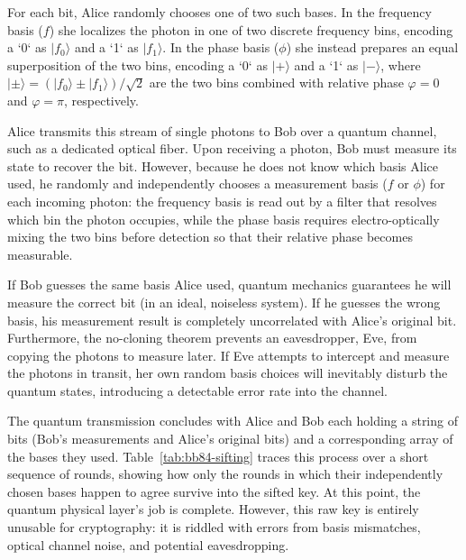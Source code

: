 For each bit, Alice randomly chooses one of two such bases. In the frequency basis ($f$) she localizes the photon in one of two discrete frequency bins, encoding a `0` as $|f_0\rangle$ and a `1` as $|f_1\rangle$. In the phase basis ($\phi$) she instead prepares an equal superposition of the two bins, encoding a `0` as $|{+}\rangle$ and a `1` as $|{-}\rangle$, where $|{\pm}\rangle = (|f_0\rangle \pm |f_1\rangle)/\sqrt{2}$ are the two bins combined with relative phase $\varphi=0$ and $\varphi=\pi$, respectively.

Alice transmits this stream of single photons to Bob over a quantum channel, such as a dedicated optical fiber. Upon receiving a photon, Bob must measure its state to recover the bit. However, because he does not know which basis Alice used, he randomly and independently chooses a measurement basis ($f$ or $\phi$) for each incoming photon: the frequency basis is read out by a filter that resolves which bin the photon occupies, while the phase basis requires electro-optically mixing the two bins before detection so that their relative phase becomes measurable.

If Bob guesses the same basis Alice used, quantum mechanics guarantees he will measure the correct bit (in an ideal, noiseless system). If he guesses the wrong basis, his measurement result is completely uncorrelated with Alice's original bit. Furthermore, the no-cloning theorem prevents an eavesdropper, Eve, from copying the photons to measure later. If Eve attempts to intercept and measure the photons in transit, her own random basis choices will inevitably disturb the quantum states, introducing a detectable error rate into the channel.

The quantum transmission concludes with Alice and Bob each holding a string of bits (Bob's measurements and Alice's original bits) and a corresponding array of the bases they used. Table~\ref{tab:bb84-sifting} traces this process over a short sequence of rounds, showing how only the rounds in which their independently chosen bases happen to agree survive into the sifted key. At this point, the quantum physical layer's job is complete. However, this raw key is entirely unusable for cryptography: it is riddled with errors from basis mismatches, optical channel noise, and potential eavesdropping.

